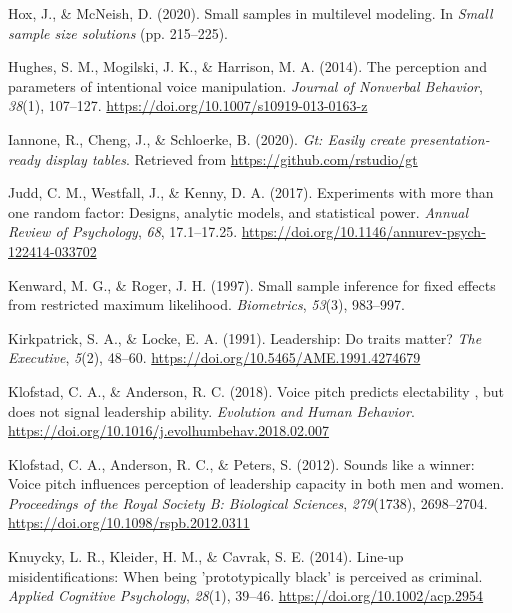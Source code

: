 \documentclass[
  english,
  man, noextraspace,floatsintext]{apa6}
\newlength{\cslhangindent}
\newenvironment{cslreferences}%
  {\setlength{\parindent}{0pt}%
  \everypar{\setlength{\hangindent}{\cslhangindent}}\ignorespaces}%
  {\par}
\begin{document}
\begin{cslreferences}
\leavevmode\hypertarget{ref-Hox2020}{}%
Hox, J., \& McNeish, D. (2020). Small samples in multilevel modeling. In \emph{Small sample size solutions} (pp. 215--225).

\leavevmode\hypertarget{ref-Hughes2014}{}%
Hughes, S. M., Mogilski, J. K., \& Harrison, M. A. (2014). The perception and parameters of intentional voice manipulation. \emph{Journal of Nonverbal Behavior}, \emph{38}(1), 107--127. \url{https://doi.org/10.1007/s10919-013-0163-z}

\leavevmode\hypertarget{ref-R-gt}{}%
Iannone, R., Cheng, J., \& Schloerke, B. (2020). \emph{Gt: Easily create presentation-ready display tables}. Retrieved from \url{https://github.com/rstudio/gt}

\leavevmode\hypertarget{ref-Judd2017}{}%
Judd, C. M., Westfall, J., \& Kenny, D. A. (2017). Experiments with more than one random factor: Designs, analytic models, and statistical power. \emph{Annual Review of Psychology}, \emph{68}, 17.1--17.25. \url{https://doi.org/10.1146/annurev-psych-122414-033702}

\leavevmode\hypertarget{ref-Kenward1997}{}%
Kenward, M. G., \& Roger, J. H. (1997). Small sample inference for fixed effects from restricted maximum likelihood. \emph{Biometrics}, \emph{53}(3), 983--997.

\leavevmode\hypertarget{ref-Kirkpatrick1991}{}%
Kirkpatrick, S. A., \& Locke, E. A. (1991). Leadership: Do traits matter? \emph{The Executive}, \emph{5}(2), 48--60. \url{https://doi.org/10.5465/AME.1991.4274679}

\leavevmode\hypertarget{ref-Klofstad2018}{}%
Klofstad, C. A., \& Anderson, R. C. (2018). Voice pitch predicts electability , but does not signal leadership ability. \emph{Evolution and Human Behavior}. \url{https://doi.org/10.1016/j.evolhumbehav.2018.02.007}

\leavevmode\hypertarget{ref-Klofstad2012}{}%
Klofstad, C. A., Anderson, R. C., \& Peters, S. (2012). Sounds like a winner: Voice pitch influences perception of leadership capacity in both men and women. \emph{Proceedings of the Royal Society B: Biological Sciences}, \emph{279}(1738), 2698--2704. \url{https://doi.org/10.1098/rspb.2012.0311}

\leavevmode\hypertarget{ref-Knuycky2014}{}%
Knuycky, L. R., Kleider, H. M., \& Cavrak, S. E. (2014). Line-up misidentifications: When being 'prototypically black' is perceived as criminal. \emph{Applied Cognitive Psychology}, \emph{28}(1), 39--46. \url{https://doi.org/10.1002/acp.2954}


\end{cslreferences}
\end{document}

